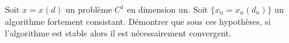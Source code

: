 
\begin{exercice}\label{exoSerieTrois0001}

	Soit $x=x(d)$ un problème $C^1$ en dimension un. Soit $\{x_n=x_n(d_n)\}$ un algorithme fortement consistant. Démontrer que sous ces hypothèses, si l'algorithme est stable alors il est nécessairement convergent.

\end{exercice}
